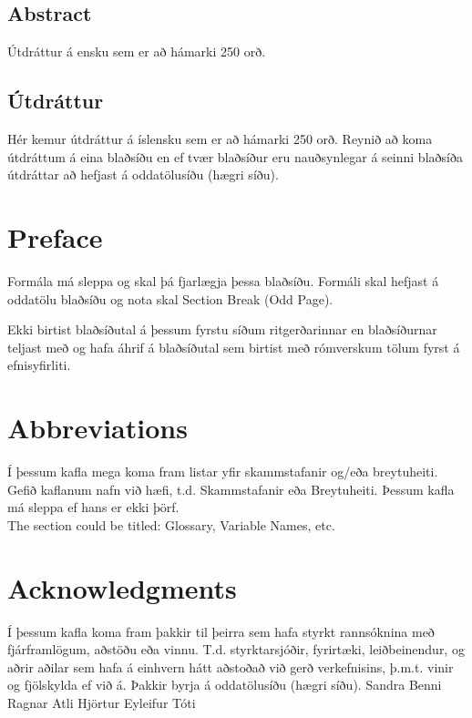 \documentclass[a4paper,12pt,twoside,BCOR=10mm]{scrbook}
\theoremstyle{definition}
\theoremstyle{definition}
\theoremstyle{definition}
\begin{document}
\setcounter{page}{5}
\section*{\huge Abstract}
Útdráttur á ensku sem er að hámarki 250 orð.
\vfill \vspace*{1cm}
\section*{\huge Útdráttur}
Hér kemur útdráttur á íslensku sem er að hámarki 250 orð. Reynið að koma útdráttum á eina blaðsíðu en ef tvær blaðsíður eru nauðsynlegar á seinni blaðsíða útdráttar að hefjast á oddatölusíðu (hægri síðu).
\vfill
\newpage

\chapter*{Preface}
Formála má sleppa og skal þá fjarlægja þessa blaðsíðu. Formáli skal hefjast á oddatölu blaðsíðu og nota skal Section Break (Odd Page).

Ekki birtist blaðsíðutal á þessum fyrstu síðum ritgerðarinnar en blaðsíðurnar teljast með og hafa áhrif á blaðsíðutal sem birtist með rómverskum tölum fyrst á efnisyfirliti.

\tableofcontents
\listoffigures
\listoftables



\chapter*{Abbreviations}
Í þessum kafla mega koma fram listar yfir skammstafanir og/eða breytuheiti. Gefið kaflanum nafn við hæfi, t.d. Skammstafanir eða Breytuheiti. Þessum kafla má sleppa ef hans er ekki þörf. \\
The section could be titled: Glossary, Variable Names, etc.



\chapter*{Acknowledgments}
Í þessum kafla koma fram þakkir til þeirra sem hafa styrkt rannsóknina með fjárframlögum, aðstöðu eða vinnu. T.d. styrktarsjóðir, fyrirtæki, leiðbeinendur, og aðrir aðilar sem hafa á einhvern hátt aðstoðað við gerð verkefnisins, þ.m.t. vinir og fjölskylda ef við á. Þakkir byrja á oddatölusíðu (hægri síðu).
Sandra
Benni
Ragnar
Atli
Hjörtur
Eyleifur
Tóti
\end{document}
